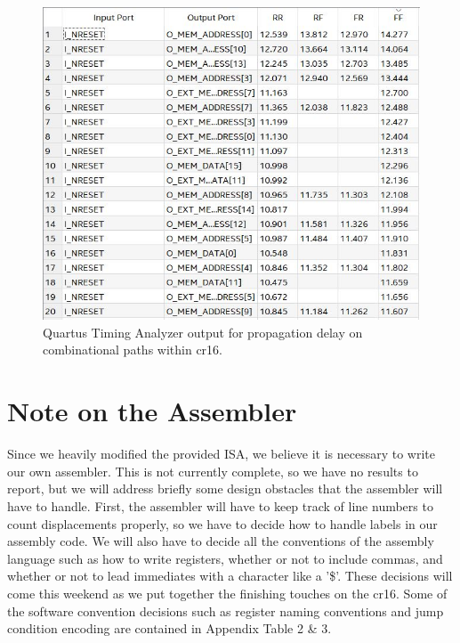 \documentclass[conference]{IEEEtran}
\begin{document}
\begin{figure}[t]
    \centering
    \includegraphics[scale=0.65]{resources/figures/prop_delay_cr16.jpg}
    \caption{Quartus Timing Analyzer output for propagation delay on combinational paths within cr16.}
    \label{fig:prop_delay}
\end{figure}

\section{Note on the Assembler}
Since we heavily modified the provided ISA, we believe it is necessary to write our own assembler. This is not currently complete, so we have no results to report, but we will address briefly some design obstacles that the assembler will have to handle. First, the assembler will have to keep track of line numbers to count displacements properly, so we have to decide how to handle labels in our assembly code. We will also have to decide all the conventions of the assembly language such as how to write registers, whether or not to include commas, and whether or not to lead immediates with a character like a '\$'. These decisions will come this weekend as we put together the finishing touches on the cr16. Some of the software convention decisions such as register naming conventions and jump condition encoding are contained in Appendix Table 2 \& 3.
\end{document}
